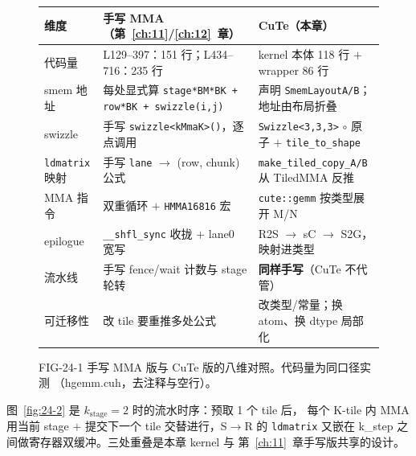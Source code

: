 \begin{figure}[htbp]
\centering
\small
\begin{tabular}{p{2.5cm}p{5.3cm}p{5.7cm}}
\toprule
维度 & 手写 MMA（第~\ref{ch:11}/\ref{ch:12}~章） & CuTe（本章） \\
\midrule
代码量 & L129--397：151 行；L434--716：235 行 &
kernel 本体 118 行 $+$ wrapper 86 行 \\
\addlinespace
smem 地址 & 每处显式算 \texttt{stage*BM*BK + row*BK + swizzle\allowbreak{}(i,\allowbreak{}j)} &
声明 \texttt{Smem\allowbreak{}Layout\allowbreak{}A/\allowbreak{}B}；地址由布局折叠 \\
\addlinespace
swizzle & 手写 \texttt{swizzle\allowbreak{}<k\allowbreak{}Mma\allowbreak{}K>\allowbreak{}()}，逐点调用 &
\texttt{Swizzle\allowbreak{}<3,\allowbreak{}3,\allowbreak{}3>} $\circ$ 原子 $+$ \texttt{tile\_\allowbreak{}to\_\allowbreak{}shape} \\
\addlinespace
\texttt{ldmatrix} 映射 & 手写 \texttt{lane} $\to$ (row, chunk) 公式 &
\texttt{make\_\allowbreak{}tiled\_\allowbreak{}copy\_\allowbreak{}A/\allowbreak{}B} 从 TiledMMA 反推 \\
\addlinespace
MMA 指令 & 双重循环 $+$ \texttt{HMMA16816} 宏 &
\texttt{cute::gemm} 按类型展开 M/N \\
\addlinespace
epilogue & \texttt{\_\_shfl\_sync} 收拢 $+$ lane0 宽写 &
R2S $\to$ sC $\to$ S2G，映射进类型 \\
\addlinespace
流水线 & 手写 fence/wait 计数与 stage 轮转 &
\textbf{同样手写}（CuTe 不代管） \\
\addlinespace
可迁移性 & 改 tile 要重推多处公式 &
改类型/常量；换 atom、换 dtype 局部化 \\
\bottomrule
\end{tabular}
\caption{FIG-24-1 手写 MMA 版与 CuTe 版的八维对照。代码量为同口径实测
（hgemm.cuh，去注释与空行）。}
\label{fig:24-1}
\end{figure}

图~\ref{fig:24-2} 是 $k_{\mathrm{stage}}=2$ 时的流水时序：预取 1 个 tile 后，
每个 K-tile 内 MMA 用当前 stage $+$ 提交下一个 tile 交替进行，S$\to$R 的
\texttt{ldmatrix} 又嵌在 k\_step 之间做寄存器双缓冲。三处重叠是本章 kernel 与
第~\ref{ch:11}~章手写版共享的设计。

